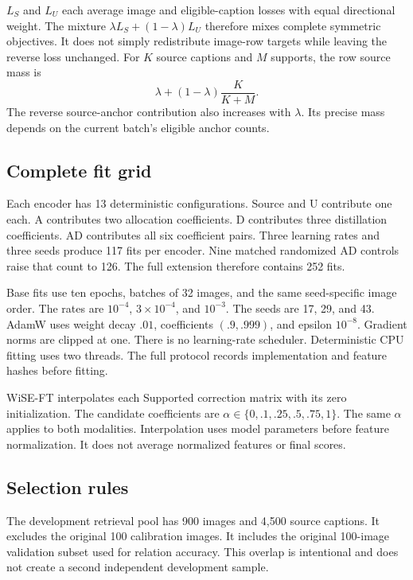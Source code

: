 $L_S$ and $L_U$ each average image and eligible-caption losses with equal directional weight.
The mixture $\lambda L_S+(1-\lambda)L_U$ therefore mixes complete symmetric objectives.
It does not simply redistribute image-row targets while leaving the reverse loss unchanged.
For $K$ source captions and $M$ supports, the row source mass is
\begin{equation}
\lambda+(1-\lambda)\frac{K}{K+M}.
\end{equation}
The reverse source-anchor contribution also increases with $\lambda$.
Its precise mass depends on the current batch's eligible anchor counts.

\subsection{Complete fit grid}
Each encoder has 13 deterministic configurations.
Source and U contribute one each.
A contributes two allocation coefficients.
D contributes three distillation coefficients.
AD contributes all six coefficient pairs.
Three learning rates and three seeds produce 117 fits per encoder.
Nine matched randomized AD controls raise that count to 126.
The full extension therefore contains 252 fits.

Base fits use ten epochs, batches of 32 images, and the same seed-specific image order.
The rates are $10^{-4}$, $3\times10^{-4}$, and $10^{-3}$.
The seeds are 17, 29, and 43.
AdamW uses weight decay $.01$, coefficients $(.9,.999)$, and epsilon $10^{-8}$.
Gradient norms are clipped at one.
There is no learning-rate scheduler.
Deterministic CPU fitting uses two threads.
The full protocol records implementation and feature hashes before fitting.

WiSE-FT interpolates each Supported correction matrix with its zero initialization.
The candidate coefficients are $\alpha\in\{0,.1,.25,.5,.75,1\}$.
The same $\alpha$ applies to both modalities.
Interpolation uses model parameters before feature normalization.
It does not average normalized features or final scores.

\subsection{Selection rules}
The development retrieval pool has 900 images and 4,500 source captions.
It excludes the original 100 calibration images.
It includes the original 100-image validation subset used for relation accuracy.
This overlap is intentional and does not create a second independent development sample.


